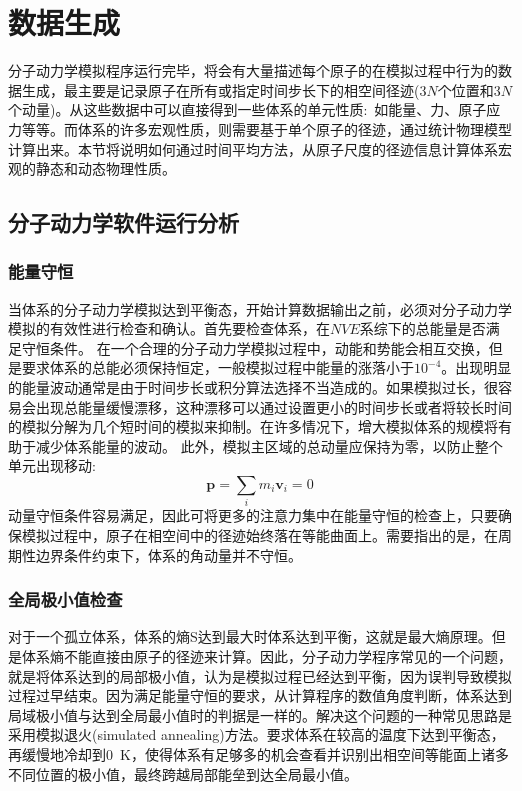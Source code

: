 \section{数据生成}
分子动力学模拟程序运行完毕，将会有大量描述每个原子的在模拟过程中行为的数据生成，最主要是记录原子在所有或指定时间步长下的相空间径迹(3$N$个位置和3$N$个动量)。从这些数据中可以直接得到一些体系的单元性质:~如能量、力、原子应力等等。而体系的许多宏观性质，则需要基于单个原子的径迹，通过统计物理模型计算出来。本节将说明如何通过时间平均方法，从原子尺度的径迹信息计算体系宏观的静态和动态物理性质。
\subsection{分子动力学软件运行分析}
\subsubsection{能量守恒}
当体系的分子动力学模拟达到平衡态，开始计算数据输出之前，必须对分子动力学模拟的有效性进行检查和确认。首先要检查体系，在$NVE$系综下的总能量是否满足守恒条件。
在一个合理的分子动力学模拟过程中，动能和势能会相互交换，但是要求体系的总能必须保持恒定，一般模拟过程中能量的涨落小于$10^{−4}$。出现明显的能量波动通常是由于时间步长或积分算法选择不当造成的。如果模拟过长，很容易会出现总能量缓慢漂移，这种漂移可以通过设置更小的时间步长或者将较长时间的模拟分解为几个短时间的模拟来抑制。在许多情况下，增大模拟体系的规模将有助于减少体系能量的波动。
此外，模拟主区域的总动量应保持为零，以防止整个单元出现移动:
\begin{equation}
	\mathbf{p}=\sum_im_i\mathbf{v}_i=0
	\label{eq:momentum_conserved}
\end{equation}
动量守恒条件容易满足，因此可将更多的注意力集中在能量守恒的检查上，只要确保模拟过程中，原子在相空间中的径迹始终落在等能曲面上。需要指出的是，在周期性边界条件约束下，体系的角动量并不守恒。
\subsubsection{全局极小值检查}
对于一个孤立体系，体系的熵S达到最大时体系达到平衡，这就是最大熵原理。但是体系熵不能直接由原子的径迹来计算。因此，分子动力学程序常见的一个问题，就是将体系达到的局部极小值，认为是模拟过程已经达到平衡，因为误判导致模拟过程过早结束。因为满足能量守恒的要求，从计算程序的数值角度判断，体系达到局域极小值与达到全局最小值时的判据是一样的。解决这个问题的一种常见思路是采用模拟退火\textrm{(simulated annealing)}方法。要求体系在较高的温度下达到平衡态，再缓慢地冷却到0~\textrm{K}，使得体系有足够多的机会查看并识别出相空间等能面上诸多不同位置的极小值，最终跨越局部能垒到达全局最小值。
